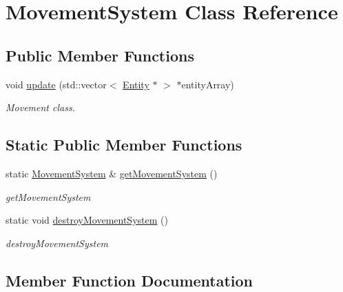 \hypertarget{class_movement_system}{}\section{Movement\+System Class Reference}
\label{class_movement_system}
\subsection*{Public Member Functions}
\begin{DoxyCompactItemize}
\item 
void \hyperlink{class_movement_system_a0795197be538c631332c888824ab1bee}{update} (std\+::vector$<$ \hyperlink{class_entity}{Entity} $\ast$ $>$ $\ast$entity\+Array)
\begin{DoxyCompactList}\small\item\em Movement class. \end{DoxyCompactList}\end{DoxyCompactItemize}
\subsection*{Static Public Member Functions}
\begin{DoxyCompactItemize}
\item 
static \hyperlink{class_movement_system}{Movement\+System} \& \hyperlink{class_movement_system_a9c24da715496fbe082e1302091a8cf2c}{get\+Movement\+System} ()
\begin{DoxyCompactList}\small\item\em get\+Movement\+System \end{DoxyCompactList}\item 
static void \hyperlink{class_movement_system_a24947d2de2835b087cabad3dce7d431c}{destroy\+Movement\+System} ()
\begin{DoxyCompactList}\small\item\em destroy\+Movement\+System \end{DoxyCompactList}\end{DoxyCompactItemize}


\subsection{Member Function Documentation}
\hypertarget{class_movement_system_a24947d2de2835b087cabad3dce7d431c}{}
